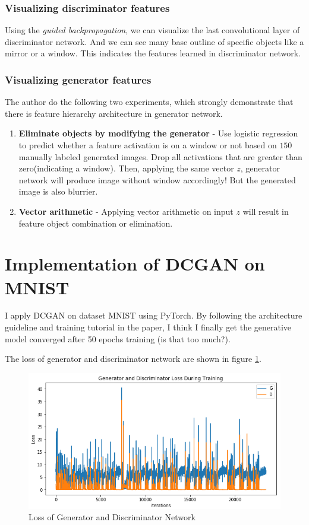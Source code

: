 \documentclass{article} %
\begin{document}
\subsubsection{Visualizing discriminator features}

Using the \emph{guided backpropagation}, we can visualize the last convolutional layer of discriminator network. And we can see many base outline of specific objects like a mirror or a window. This indicates the features learned in discriminator network.

\subsubsection{Visualizing generator features}

The author do the following two experiments, which strongly demonstrate that there is feature hierarchy architecture in generator network.

\begin{enumerate}
    \item \textbf{Eliminate objects by modifying the generator} - Use logistic regression to predict whether a feature activation is on a window or not based on $150$ manually labeled generated images. Drop all activations that are greater than zero(indicating a window). Then, applying the same vector $z$, generator network will produce image without window accordingly! But the generated image is also blurrier.
    \item \textbf{Vector arithmetic} - Applying vector arithmetic on input $z$ will result in feature object combination or elimination.
\end{enumerate}

\section{Implementation of DCGAN on MNIST}

I apply DCGAN on dataset MNIST using PyTorch. By following the architecture guideline and training tutorial in the paper, I think I finally get the generative model converged after 50 epochs training (is that too much?).

The loss of generator and discriminator network are shown in figure \ref{fig:Loss}.

\begin{figure}[h]
	\centering
	\includegraphics[width=0.9\linewidth]{figures/Loss_of_G_and_D.png}
	\caption{Loss of Generator and Discriminator Network}
	\label{fig:Loss}
\end{figure}
\end{document}
